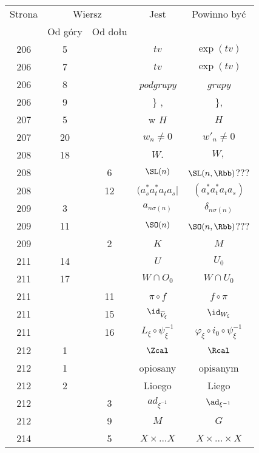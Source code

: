 \documentclass[a4paper,11pt]{article}
\numberwithin{equation}{section}
\begin{document}
\begin{center}
  \begin{tabular}{|c|c|c|c|c|}
    \hline
    Strona & \multicolumn{2}{c|}{Wiersz} & Jest
                              & Powinno być \\ \cline{2-3}
    & Od góry & Od dołu & & \\
    \hline
    206 & \hphantom{0}5 & & $t v$ & $\exp( t v )$ \\
    206 & \hphantom{0}7 & & $t v$ & $\exp( t v )$ \\
    206 & \hphantom{0}8 & & \textit{podgrupy} & \textit{grupy} \\
    206 & \hphantom{0}9 & & \} , & \}, \\
    207 & \hphantom{0}5 & & w $H$ & $H$ \\
    207 & 20 & & $w_{ n } \neq 0$ & $w'_{ n } \neq 0$ \\
    208 & 18 & & $W.$ & $W,$ \\
    208 & & \hphantom{0}6 & $\SL( n )$ & $\SL( n, \Rbb )$??? \\
    208 & & 12 & $( a^{ * }_{ s } a^{ * }_{ t } a_{ t } a_{ s } |$
           & $( a^{ * }_{ s } a^{ * }_{ t } a_{ t } a_{ s } )$ \\
    209 & \hphantom{0}3 & & $a_{ n \sigma( n ) }$ & $\delta_{ n \sigma( n ) }$ \\
    209 & 11 & & $\SO( n )$ & $\SO( n, \Rbb )$??? \\
    209 & & \hphantom{0}2 & $K$ & $M$ \\
    211 & 14 & & $U$ & $U_{ 0 }$ \\
    211 & 17 & & $W \! \cap \! O_{ 0 }$ & $W \cap U_{ 0 }$ \\[0.2em]
    211 & & 11 & $\pi \circ f$ & $f \circ \pi$ \\
    211 & & 15 & $\id_{ \widetilde{ V }_{ \xi } }$ & $\id_{ W_{ \xi } }$ \\
    211 & & 16 & $L_{ \xi } \circ \psi_{ \xi }^{ -1 }$
           & $\varphi_{ \xi } \circ i_{ 0 } \circ \psi_{ \xi }^{ -1 }$ \\[0.3em]
    212 & \hphantom{0}1 & & $\Zcal$ & $\Rcal$ \\
    212 & \hphantom{0}1 & & opiosany & opisanym \\
    212 & \hphantom{0}2 & & Lioego & Liego \\
    212 & & \hphantom{0}3 & $ad_{ \xi^{ -1 } }$ & $\ad_{ \xi^{ -1 } }$ \\
    212 & & \hphantom{0}9 & $M$ & $G$ \\
    214 & & \hphantom{0}5 & $X \times \ldots X$ & $X \times \ldots \times X$ \\

\end{tabular}
\end{center}
\end{document}
